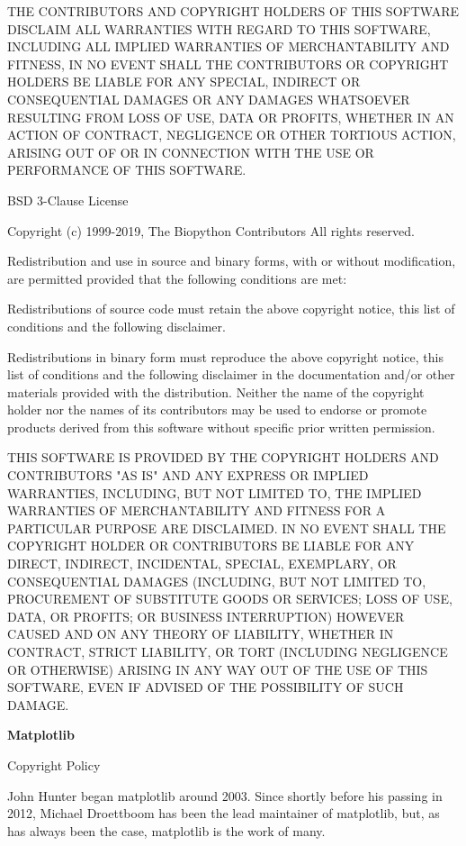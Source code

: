 THE CONTRIBUTORS AND COPYRIGHT HOLDERS OF THIS SOFTWARE DISCLAIM ALL WARRANTIES WITH REGARD TO THIS SOFTWARE, INCLUDING ALL IMPLIED WARRANTIES OF MERCHANTABILITY AND FITNESS, IN NO EVENT SHALL THE CONTRIBUTORS OR COPYRIGHT HOLDERS BE LIABLE FOR ANY SPECIAL, INDIRECT OR CONSEQUENTIAL DAMAGES OR ANY DAMAGES WHATSOEVER RESULTING FROM LOSS OF USE, DATA OR PROFITS, WHETHER IN AN ACTION OF CONTRACT, NEGLIGENCE OR OTHER TORTIOUS ACTION, ARISING OUT OF OR IN CONNECTION WITH THE USE OR PERFORMANCE OF THIS SOFTWARE.

BSD 3-Clause License

Copyright (c) 1999-2019, The Biopython Contributors All rights reserved.

Redistribution and use in source and binary forms, with or without modification, are permitted provided that the following conditions are met:

Redistributions of source code must retain the above copyright notice, this list of conditions and the following disclaimer.

Redistributions in binary form must reproduce the above copyright notice, this list of conditions and the following disclaimer in the documentation and/or other materials provided with the distribution.
Neither the name of the copyright holder nor the names of its contributors may be used to endorse or promote products derived from this software without specific prior written permission.

THIS SOFTWARE IS PROVIDED BY THE COPYRIGHT HOLDERS AND CONTRIBUTORS "AS IS" AND ANY EXPRESS OR IMPLIED WARRANTIES, INCLUDING, BUT NOT LIMITED TO, THE IMPLIED WARRANTIES OF MERCHANTABILITY AND FITNESS FOR A PARTICULAR PURPOSE ARE DISCLAIMED. IN NO EVENT SHALL THE COPYRIGHT HOLDER OR CONTRIBUTORS BE LIABLE FOR ANY DIRECT, INDIRECT, INCIDENTAL, SPECIAL, EXEMPLARY, OR CONSEQUENTIAL DAMAGES (INCLUDING, BUT NOT LIMITED TO, PROCUREMENT OF SUBSTITUTE GOODS OR SERVICES; LOSS OF USE, DATA, OR PROFITS; OR BUSINESS INTERRUPTION) HOWEVER CAUSED AND ON ANY THEORY OF LIABILITY, WHETHER IN CONTRACT, STRICT LIABILITY, OR TORT (INCLUDING NEGLIGENCE OR OTHERWISE) ARISING IN ANY WAY OUT OF THE USE OF THIS SOFTWARE, EVEN IF ADVISED OF THE POSSIBILITY OF SUCH DAMAGE.

\textbf{Matplotlib}

Copyright Policy

John Hunter began matplotlib around 2003. Since shortly before his passing in 2012, Michael Droettboom has been the lead maintainer of matplotlib, but, as has always been the case, matplotlib is the work of many.

